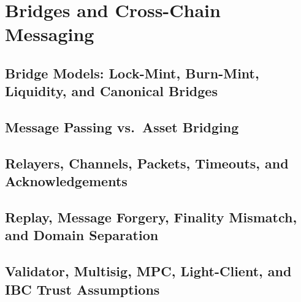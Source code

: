 \chapter{Bridges and Cross-Chain Messaging}

\section{Bridge Models: Lock-Mint, Burn-Mint, Liquidity, and Canonical Bridges}

\section{Message Passing vs.~Asset Bridging}

\section{Relayers, Channels, Packets, Timeouts, and Acknowledgements}

\section{Replay, Message Forgery, Finality Mismatch, and Domain Separation}

\section{Validator, Multisig, MPC, Light-Client, and IBC Trust Assumptions}

